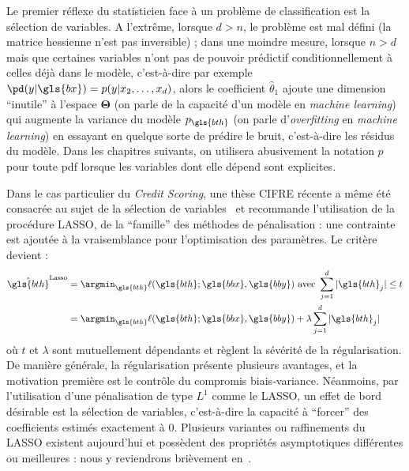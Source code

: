 Le premier réflexe du statisticien face à un problème de classification est la sélection de variables. A l'extrême, lorsque $d > n$, le problème est mal défini (la matrice hessienne n'est pas inversible) ; dans une moindre mesure, lorsque $n > d$ mais que certaines variables n'ont pas de pouvoir prédictif conditionnellement à celles déjà dans le modèle, c'est-à-dire par exemple $\pd(y | \gls{bx}) = p(y|x_2,\dots,x_d)$, alors le coefficient $\hat{\theta}_1$ ajoute une dimension ``inutile'' à l'espace $\bm{\Theta}$ (on parle de la capacité d'un modèle en \textit{machine learning}) qui augmente la variance du modèle $p_{\gls{bth}}$ (on parle d'\textit{overfitting} en \textit{machine learning}) en essayant en quelque sorte de prédire le bruit, c'est-à-dire les résidus du modèle. Dans les chapitres suivants, on utilisera abusivement la notation $p$ pour toute \gls{pdf} lorsque les variables dont elle dépend sont explicites.



Dans le cas particulier du \textit{Credit Scoring}, une thèse CIFRE récente a même été consacrée au sujet de la sélection de variables~\cite{vital2016} et recommande l'utilisation de la procédure LASSO, de la ``famille'' des méthodes de pénalisation : une contrainte est ajoutée à la vraisemblance pour l'optimisation des paramètres. Le critère devient :
\begin{align*}
\hat{\gls{bth}}^{\text{Lasso}} & = \argmin_{\gls{bth}} \ell(\gls{bth};\gls{bbx},\gls{bby}) \text{ avec } \sum_{j=1}^d |\gls{bth}_j| \leq t \\
 & = \argmin_{\gls{bth}}  \ell(\gls{bth};\gls{bbx},\gls{bby}) + \lambda \sum_{j=1}^d |\gls{bth}_j|
\end{align*}
où $t$ et $\lambda$ sont mutuellement dépendants et règlent la sévérité de la régularisation. De manière générale, la régularisation présente plusieurs avantages, et la motivation première est le contrôle du compromis biais-variance. Néanmoins, par l'utilisation d'une pénalisation de type $L^1$ comme le LASSO, un effet de bord désirable est la sélection de variables, c'est-à-dire la capacité à ``forcer'' des coefficients estimés exactement à $0$. Plusieurs variantes ou raffinements du LASSO existent aujourd'hui et possèdent des propriétés asymptotiques différentes ou meilleures : nous y reviendrons brièvement en~.


